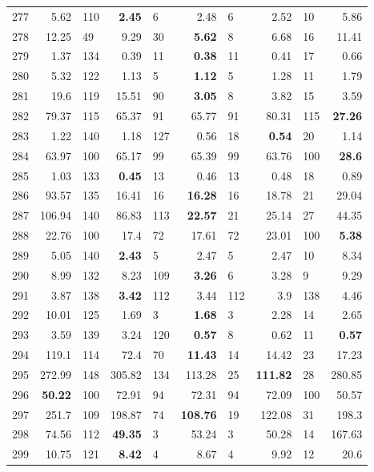 \begin{longtable}{lr@{\hskip 4pt}l@{\hskip 12pt}r@{\hskip 4pt}l@{\hskip 12pt}r@{\hskip 4pt}l@{\hskip 12pt}r@{\hskip 4pt}l@{\hskip 12pt}r}
277 & 5.62 & 110 & \textbf{2.45} & 6 & 2.48 & 6 & 2.52 & 10 & 5.86 \\
278 & 12.25 & 49 & 9.29 & 30 & \textbf{5.62} & 8 & 6.68 & 16 & 11.41 \\
279 & 1.37 & 134 & 0.39 & 11 & \textbf{0.38} & 11 & 0.41 & 17 & 0.66 \\
280 & 5.32 & 122 & 1.13 & 5 & \textbf{1.12} & 5 & 1.28 & 11 & 1.79 \\
281 & 19.6 & 119 & 15.51 & 90 & \textbf{3.05} & 8 & 3.82 & 15 & 3.59 \\
282 & 79.37 & 115 & 65.37 & 91 & 65.77 & 91 & 80.31 & 115 & \textbf{27.26} \\
283 & 1.22 & 140 & 1.18 & 127 & 0.56 & 18 & \textbf{0.54} & 20 & 1.14 \\
284 & 63.97 & 100 & 65.17 & 99 & 65.39 & 99 & 63.76 & 100 & \textbf{28.6} \\
285 & 1.03 & 133 & \textbf{0.45} & 13 & 0.46 & 13 & 0.48 & 18 & 0.89 \\
286 & 93.57 & 135 & 16.41 & 16 & \textbf{16.28} & 16 & 18.78 & 21 & 29.04 \\
287 & 106.94 & 140 & 86.83 & 113 & \textbf{22.57} & 21 & 25.14 & 27 & 44.35 \\
288 & 22.76 & 100 & 17.4 & 72 & 17.61 & 72 & 23.01 & 100 & \textbf{5.38} \\
289 & 5.05 & 140 & \textbf{2.43} & 5 & 2.47 & 5 & 2.47 & 10 & 8.34 \\
290 & 8.99 & 132 & 8.23 & 109 & \textbf{3.26} & 6 & 3.28 & 9 & 9.29 \\
291 & 3.87 & 138 & \textbf{3.42} & 112 & 3.44 & 112 & 3.9 & 138 & 4.46 \\
292 & 10.01 & 125 & 1.69 & 3 & \textbf{1.68} & 3 & 2.28 & 14 & 2.65 \\
293 & 3.59 & 139 & 3.24 & 120 & \textbf{0.57} & 8 & 0.62 & 11 & \textbf{0.57} \\
294 & 119.1 & 114 & 72.4 & 70 & \textbf{11.43} & 14 & 14.42 & 23 & 17.23 \\
295 & 272.99 & 148 & 305.82 & 134 & 113.28 & 25 & \textbf{111.82} & 28 & 280.85 \\
296 & \textbf{50.22} & 100 & 72.91 & 94 & 72.31 & 94 & 72.09 & 100 & 50.57 \\
297 & 251.7 & 109 & 198.87 & 74 & \textbf{108.76} & 19 & 122.08 & 31 & 198.3 \\
298 & 74.56 & 112 & \textbf{49.35} & 3 & 53.24 & 3 & 50.28 & 14 & 167.63 \\
299 & 10.75 & 121 & \textbf{8.42} & 4 & 8.67 & 4 & 9.92 & 12 & 20.6 \\

\end{longtable}
